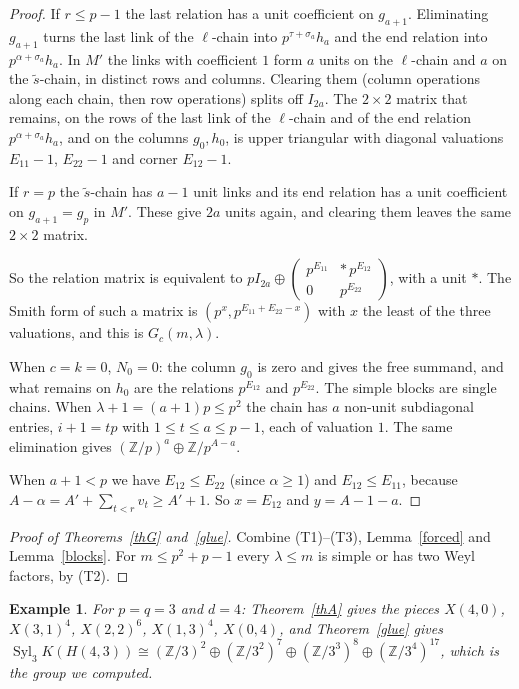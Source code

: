 \documentclass[10pt]{article}
\theoremstyle{ds}
\theoremstyle{dsrem}
\newtheorem{example}[lemma]{Example}
\newcommand{\Z}{\mathbb{Z}}
\newcommand{\Syl}{\operatorname{Syl}}
\begin{document}
\begin{proof}
If $r\le p-1$ the last relation has a unit coefficient on $g_{a+1}$. Eliminating $g_{a+1}$ turns the last link of the $\ell$-chain into $p^{\tau+\sigma_a}h_a$ and the end relation into $p^{\alpha+\sigma_a}h_a$. In $M'$ the links with coefficient $1$ form $a$ units on the $\ell$-chain and $a$ on the $\tilde s$-chain, in distinct rows and columns. Clearing them (column operations along each chain, then row operations) splits off $I_{2a}$. The $2\times2$ matrix that remains, on the rows of the last link of the $\ell$-chain and of the end relation $p^{\alpha+\sigma_a}h_a$, and on the columns $g_0,h_0$, is upper triangular with diagonal valuations $E_{11}-1$, $E_{22}-1$ and corner $E_{12}-1$.

If $r=p$ the $\tilde s$-chain has $a-1$ unit links and its end relation has a unit coefficient on $g_{a+1}=g_p$ in $M'$. These give $2a$ units again, and clearing them leaves the same $2\times2$ matrix.

So the relation matrix is equivalent to $pI_{2a}\oplus\begin{pmatrix}p^{E_{11}}&\ast\,p^{E_{12}}\\0&p^{E_{22}}\end{pmatrix}$, with a unit $\ast$. The Smith form of such a matrix is $(p^{x},p^{E_{11}+E_{22}-x})$ with $x$ the least of the three valuations, and this is $G_c(m,\lambda)$.

When $c=k=0$, $N_0=0$: the column $g_0$ is zero and gives the free summand, and what remains on $h_0$ are the relations $p^{E_{12}}$ and $p^{E_{22}}$. The simple blocks are single chains. When $\lambda+1=(a+1)p\le p^2$ the chain has $a$ non-unit subdiagonal entries, $i+1=tp$ with $1\le t\le a\le p-1$, each of valuation $1$. The same elimination gives $(\Z/p)^a\oplus\Z/p^{A-a}$.

When $a+1<p$ we have $E_{12}\le E_{22}$ (since $\alpha\ge1$) and $E_{12}\le E_{11}$, because $A-\alpha=A'+\sum_{t<r}v_t\ge A'+1$. So $x=E_{12}$ and $y=A-1-a$.
\end{proof}

\begin{proof}[Proof of Theorems~\ref{thG} and~\ref{glue}]
Combine (T1)--(T3), Lemma~\ref{forced} and Lemma~\ref{blocks}. For $m\le p^2+p-1$ every $\lambda\le m$ is simple or has two Weyl factors, by (T2).
\end{proof}

\begin{example}
For $p=q=3$ and $d=4$: Theorem~\ref{thA} gives the pieces $X(4,0)$, $X(3,1)^4$, $X(2,2)^6$, $X(1,3)^4$, $X(0,4)$, and Theorem~\ref{glue} gives $\Syl_3K(H(4,3))\cong(\Z/3)^2\oplus(\Z/3^2)^{7}\oplus(\Z/3^3)^{8}\oplus(\Z/3^4)^{17}$, which is the group we computed.
\end{example}
\end{document}
